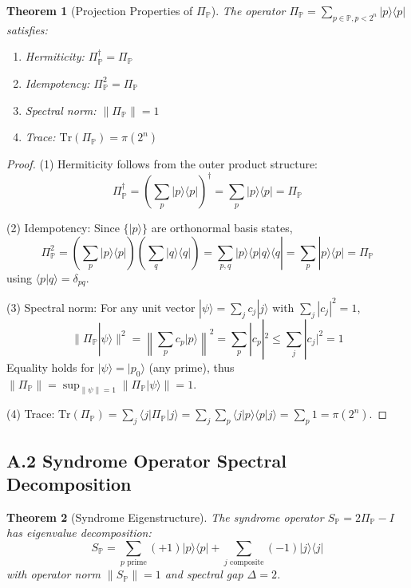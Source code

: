 \documentclass[11pt,letterpaper]{article}
\newtheorem{theorem}{Theorem}
\begin{document}
\begin{theorem}[Projection Properties of $\Pi_{\mathbb{P}}$]
The operator $\Pi_{\mathbb{P}} = \sum_{p \in \mathbb{P}, p < 2^n} |p\rangle\langle p|$ satisfies:
\begin{enumerate}
\item Hermiticity: $\Pi_{\mathbb{P}}^\dagger = \Pi_{\mathbb{P}}$
\item Idempotency: $\Pi_{\mathbb{P}}^2 = \Pi_{\mathbb{P}}$
\item Spectral norm: $\|\Pi_{\mathbb{P}}\| = 1$
\item Trace: $\text{Tr}(\Pi_{\mathbb{P}}) = \pi(2^n)$
\end{enumerate}
\end{theorem}

\begin{proof}
(1) Hermiticity follows from the outer product structure:
\[
\Pi_{\mathbb{P}}^\dagger = \left(\sum_p |p\rangle\langle p|\right)^\dagger = \sum_p |p\rangle\langle p| = \Pi_{\mathbb{P}}
\]

(2) Idempotency: Since $\{|p\rangle\}$ are orthonormal basis states,
\[
\Pi_{\mathbb{P}}^2 = \left(\sum_p |p\rangle\langle p|\right)\left(\sum_q |q\rangle\langle q|\right) = \sum_{p,q} |p\rangle\langle p|q\rangle\langle q| = \sum_p |p\rangle\langle p| = \Pi_{\mathbb{P}}
\]
using $\langle p|q\rangle = \delta_{pq}$.

(3) Spectral norm: For any unit vector $|\psi\rangle = \sum_j c_j|j\rangle$ with $\sum_j |c_j|^2 = 1$,
\[
\|\Pi_{\mathbb{P}}|\psi\rangle\|^2 = \left\|\sum_p c_p|p\rangle\right\|^2 = \sum_p |c_p|^2 \leq \sum_j |c_j|^2 = 1
\]
Equality holds for $|\psi\rangle = |p_0\rangle$ (any prime), thus $\|\Pi_{\mathbb{P}}\| = \sup_{\|\psi\|=1} \|\Pi_{\mathbb{P}}|\psi\rangle\| = 1$.

(4) Trace: $\text{Tr}(\Pi_{\mathbb{P}}) = \sum_j \langle j|\Pi_{\mathbb{P}}|j\rangle = \sum_j \sum_p \langle j|p\rangle\langle p|j\rangle = \sum_p 1 = \pi(2^n)$.
\end{proof}

\subsection{A.2 Syndrome Operator Spectral Decomposition}

\begin{theorem}[Syndrome Eigenstructure]
The syndrome operator $S_{\mathbb{P}} = 2\Pi_{\mathbb{P}} - I$ has eigenvalue decomposition:
\[
S_{\mathbb{P}} = \sum_{p \text{ prime}} (+1)|p\rangle\langle p| + \sum_{j \text{ composite}} (-1)|j\rangle\langle j|
\]
with operator norm $\|S_{\mathbb{P}}\| = 1$ and spectral gap $\Delta = 2$.
\end{theorem}
\end{document}
